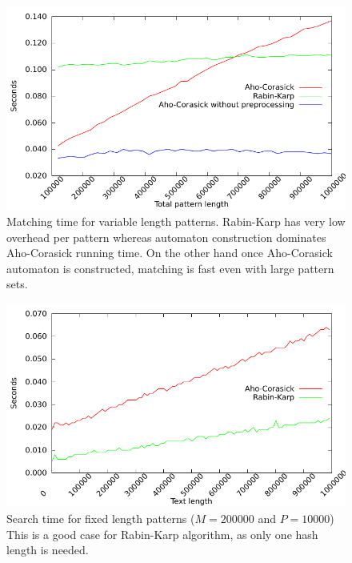 \documentclass[final]{beamer}
\begin{document}
\begin{poster}
\begin{figure}
{\centering
 \includegraphics[width=25cm]{var_len.pdf}
\caption[Matching time for variable length patterns]
{
Matching time for variable length patterns.
\newline
\newline
Rabin-Karp has very low overhead per pattern whereas 
automaton construction dominates 
Aho-Corasick running time.
On the other hand once Aho-Corasick automaton is constructed,
matching is fast even with large pattern sets.
}
\label{fig:var_len}
}
\end{figure}



\begin{figure}
\centering
 \includegraphics[width=25cm]{text_len_fixed.pdf}
\caption{
Search time for fixed length patterns ($M = 200000$ and $P = 10000$)
    \newline
    \newline
This is a good case for Rabin-Karp algorithm, as only one hash length is needed.
}


\end{figure}
\end{poster}
\end{document}
